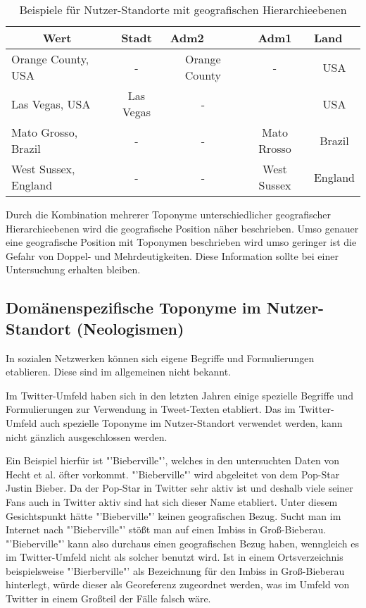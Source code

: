 			\begin{table}[h]
			\centering
			\caption{Beispiele für Nutzer-Standorte mit geografischen Hierarchieebenen}
			\label{my-label}
			\begin{tabular}{|l|c|c|c|c|}
			\hline
			\multicolumn{1}{|c|}{Wert} & Stadt       & \multicolumn{1}{l|}{Adm2} & Adm1 & \multicolumn{1}{l|}{Land} \\ \hline
			Orange County, USA 		   & - 			 & Orange County										 & - 							   & USA    					\\ \hline
			Las Vegas, USA 		       & Las Vegas   & - 												     &								   & USA 					    \\ \hline
			Mato Grosso, Brazil        & -           & -                                                     & Mato Rrosso                     & Brazil                    \\ \hline
			West Sussex, England       & -           & -                                                     & West Sussex                     & England                   \\ \hline
			\end{tabular}
			\end{table}
 
			Durch die Kombination mehrerer Toponyme unterschiedlicher geografischer Hierarchieebenen wird die geografische Position näher beschrieben.
			Umso genauer eine geografische Position mit Toponymen beschrieben wird umso geringer ist die Gefahr von Doppel- und Mehrdeutigkeiten.  
			Diese Information sollte bei einer Untersuchung erhalten bleiben.
			
		\subsection{Domänenspezifische Toponyme im Nutzer-Standort (Neologismen)} \label{sub:domaenenspezBezug} 

			In sozialen Netzwerken können sich eigene Begriffe und Formulierungen etablieren. 
			Diese sind im allgemeinen nicht bekannt.


			Im Twitter-Umfeld haben sich in den letzten Jahren einige spezielle Begriffe und Formulierungen zur Verwendung in Tweet-Texten etabliert. 
			Das im Twitter-Umfeld auch spezielle Toponyme im Nutzer-Standort verwendet werden, kann nicht gänzlich ausgeschlossen werden. 

			Ein Beispiel hierfür ist "'Bieberville"', welches in den untersuchten Daten von Hecht et al. öfter vorkommt.
			"'Bieberville"' wird abgeleitet von dem Pop-Star Justin Bieber.	
			Da der Pop-Star in Twitter sehr aktiv ist und deshalb viele seiner Fans auch in Twitter aktiv sind hat sich dieser Name etabliert.
			Unter diesem Gesichtspunkt hätte "'Bieberville"' keinen geografischen Bezug.
			Sucht man im Internet nach "'Bieberville"' stößt man auf einen Imbiss in Groß-Bieberau.
			"'Bieberville"' kann also durchaus einen geografischen Bezug haben, wenngleich es im Twitter-Umfeld nicht als solcher benutzt wird. 
			Ist in einem Ortsverzeichnis beispielsweise "'Bierberville"' als Bezeichnung für den Imbiss in Groß-Bieberau hinterlegt, würde dieser als Georeferenz zugeordnet werden, was im Umfeld von Twitter in einem Großteil der Fälle falsch wäre.

